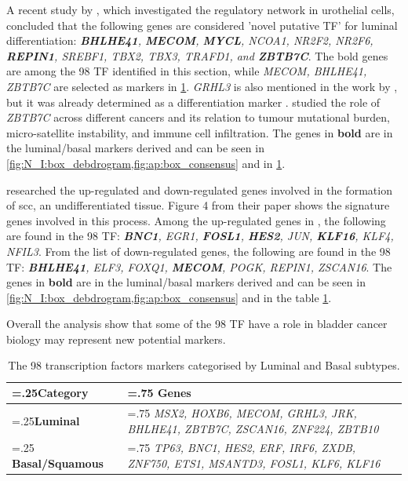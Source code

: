 A recent study by \citet{Ramal2024-ha}, which investigated the regulatory network in urothelial cells, concluded that the following genes are considered 'novel putative TF' for luminal differentiation: \textit{\textbf{BHLHE41}, \textbf{MECOM}, \textbf{MYCL}, NCOA1, NR2F2, NR2F6, \textbf{REPIN1}, SREBF1, TBX2, TBX3, TRAFD1, and \textbf{ZBTB7C}}. The bold genes are among the 98 TF identified in this section, while \textit{MECOM, BHLHE41, ZBTB7C} are selected as markers in \cref{tab:N_I:genes_lum_basal}. \textit{GRHL3} is also mentioned in the work by \citet{Ramal2024-ha}, but it was already determined as a differentiation marker \citep{Bock2014-zy}. \citet{Chen2021-tc} studied the role of \textit{ZBTB7C} across different cancers and its relation to tumour mutational burden, micro-satellite instability, and immune cell infiltration. The genes in \textbf{bold} are in the luminal/basal markers derived and can be seen in \cref{fig:N_I:box_debdrogram,fig:ap:box_consensus} and in \cref{tab:N_I:genes_lum_basal}.

\citet{Hurst2022-sp} researched the up-regulated and down-regulated genes involved in the formation of \acrfull{scc}, an undifferentiated tissue. Figure 4 from their paper shows the signature genes involved in this process. Among the up-regulated genes in \citet{Hurst2022-sp}, the following are found in the 98 TF: \textit{\textbf{BNC1}, EGR1, \textbf{FOSL1}, \textbf{HES2}, JUN, \textbf{KLF16}, KLF4, NFIL3}. From the list of down-regulated genes, the following are found in the 98 TF: \textit{\textbf{BHLHE41}, ELF3, FOXQ1, \textbf{MECOM}, POGK, REPIN1, ZSCAN16}. The genes in \textbf{bold} are in the luminal/basal markers derived and can be seen in \cref{fig:N_I:box_debdrogram,fig:ap:box_consensus} and in the table \cref{tab:N_I:genes_lum_basal}.

% 
Overall the analysis show that some of the 98 TF have a role in bladder cancer biology may represent new potential markers.

\begin{table}[!htb]
  \centering
  \small
  \begin{tabularx}{\textwidth}{>{\hsize=.25\hsize}X|>{\hsize=.75\hsize}X}
    \toprule
    \textbf{Category} & \textbf{Genes} \\
    \midrule
    \textbf{Luminal} & \textit{MSX2, HOXB6, MECOM, GRHL3, JRK, BHLHE41, ZBTB7C, ZSCAN16, ZNF224, ZBTB10} \\
    \midrule
    \textbf{Basal/Squamous} & \textit{TP63, BNC1, HES2, ERF, IRF6, ZXDB, ZNF750, ETS1, MSANTD3, FOSL1, KLF6, KLF16} \\
    \bottomrule
  \end{tabularx}
  \caption[Luminal and Basal markers from the 98 TF]{The 98 transcription factors markers categorised by Luminal and Basal subtypes.} %
  \label{tab:N_I:genes_lum_basal}
\end{table}



